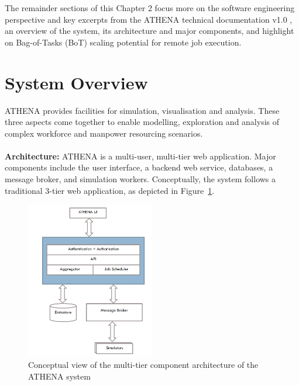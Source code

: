 The remainder sections of this Chapter 2 focus more on the software engineering perspective and key excerpts from the ATHENA technical documentation v1.0 \parencite{athenaAllDoc}, an overview of the system, its architecture and major components, and highlight on Bag-of-Tasks (BoT) scaling potential for remote job execution.

\section{System Overview}

ATHENA provides facilities for simulation, visualisation and analysis. These three aspects come together to enable modelling, exploration and analysis of complex workforce and manpower resourcing scenarios.
\\
\\
\textbf{Architecture:} \quad ATHENA is a multi-user, multi-tier web application. Major components include the user interface, a backend web service, databases, a message broker, and simulation workers. Conceptually, the system follows a traditional 3-tier web application, as depicted in Figure~\ref{fig:conceptArch}. 

\begin{figure}
\centering
\includegraphics[width=0.5\textwidth]{Figures/ATHENA_conceptual_architecture}
\decoRule
\caption[ATHENA Conceptual Architecture]{Conceptual view of the multi-tier component architecture of the ATHENA system}
\label{fig:conceptArch}
\end{figure}

